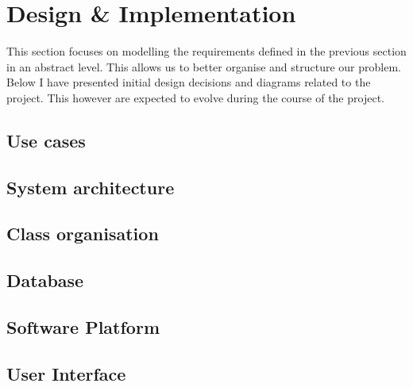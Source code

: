 \chapter{Design \& Implementation}

This section focuses on modelling the requirements defined in the previous
section in an abstract level. This allows us to better organise and structure
our problem. Below I have presented initial design decisions and diagrams
related to the project. This however are expected to evolve during the course
of the project.
\section{Use cases}
\section{System architecture}
\section{Class organisation}
\section{Database}
\section{Software Platform}
\section{User Interface}